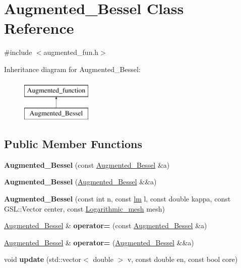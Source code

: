 \hypertarget{classAugmented__Bessel}{}\section{Augmented\+\_\+\+Bessel Class Reference}
\label{classAugmented__Bessel}


{\ttfamily \#include $<$augmented\+\_\+fun.\+h$>$}

Inheritance diagram for Augmented\+\_\+\+Bessel\+:\begin{figure}[H]
\begin{center}
\leavevmode
\includegraphics[height=2.000000cm]{classAugmented__Bessel}
\end{center}
\end{figure}
\subsection*{Public Member Functions}
\begin{DoxyCompactItemize}
\item 
\mbox{\label{classAugmented__Bessel_a070695f0a3ef6972b557c3192652747d}} 
{\bfseries Augmented\+\_\+\+Bessel} (const \hyperlink{classAugmented__Bessel}{Augmented\+\_\+\+Bessel} \&a)
\item 
\mbox{\label{classAugmented__Bessel_a2f99aa26224af966613eaee968a0fc60}} 
{\bfseries Augmented\+\_\+\+Bessel} (\hyperlink{classAugmented__Bessel}{Augmented\+\_\+\+Bessel} \&\&a)
\item 
\mbox{\label{classAugmented__Bessel_a7251ab4138a10372bfcbc0b7e7e1468c}} 
{\bfseries Augmented\+\_\+\+Bessel} (const int n, const \hyperlink{structlm}{lm} l, const double kappa, const G\+S\+L\+::\+Vector center, const \hyperlink{classLogarithmic__mesh}{Logarithmic\+\_\+mesh} mesh)
\item 
\mbox{\label{classAugmented__Bessel_aaaea2637019dbfb95452de5dd1fc5cc5}} 
\hyperlink{classAugmented__Bessel}{Augmented\+\_\+\+Bessel} \& {\bfseries operator=} (const \hyperlink{classAugmented__Bessel}{Augmented\+\_\+\+Bessel} \&a)
\item 
\mbox{\label{classAugmented__Bessel_ac04b519c9225b23c16d4125ef8ad9ee3}} 
\hyperlink{classAugmented__Bessel}{Augmented\+\_\+\+Bessel} \& {\bfseries operator=} (\hyperlink{classAugmented__Bessel}{Augmented\+\_\+\+Bessel} \&\&a)
\item 
\mbox{\label{classAugmented__Bessel_a81cef9f14fdbdb1974810f7f995f9898}} 
void {\bfseries update} (std\+::vector$<$ double $>$ v, const double en, const bool core)
\end{DoxyCompactItemize}
